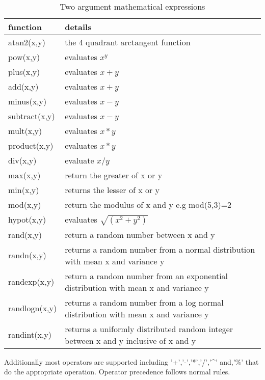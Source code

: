 \documentclass[12pt]{article} %
\begin{document}
\begin{table}[ht]

    \caption{Two argument mathematical expressions} %
    \centering %
    \begin{tabular}{l p{11cm}} %
        \hline %
        function & details \\ [0.5ex] %
        \hline %
        atan2(x,y) & the 4 quadrant arctangent function \\
        pow(x,y) & evaluates $x^y$ \\
        plus(x,y) & evaluates $ x+y$ \\
        add(x,y) & evaluates $x+y$ \\
        minus(x,y) & evaluates $ x - y$ \\
        subtract(x,y) & evaluates $ x - y$ \\
        mult(x,y) & evaluates $x*y$ \\
        product(x,y) & evaluates $x*y$\\
        div(x,y) & evaluate $x/y$ \\
        max(x,y) & return the greater of x or y \\
        min(x,y) & returns the lesser of x or y \\
        mod(x,y)  & return the modulus of x and y e.g mod(5,3)=2\\
        hypot(x,y) & evaluates $\sqrt{(x^2+y^2)}$ \\
        rand(x,y) & return a random number between x and y \\
        randn(x,y) & returns a random number from a normal distribution with mean x and variance y\\
        randexp(x,y) & return a random number from an exponential distribution with mean x and variance y \\
        randlogn(x,y) & returns a random number from a log normal distribution with mean x and variance y \\
        randint(x,y) & returns a uniformly distributed random integer between x and y inclusive of x and y \\
        \hline %
    \end{tabular}
    \label{table:func2}
\end{table}
Additionally most operators are supported including '+','-','*','/','\textasciicircum' and,'\%' that do the appropriate operation.  Operator precedence follows normal rules.
\end{document}
